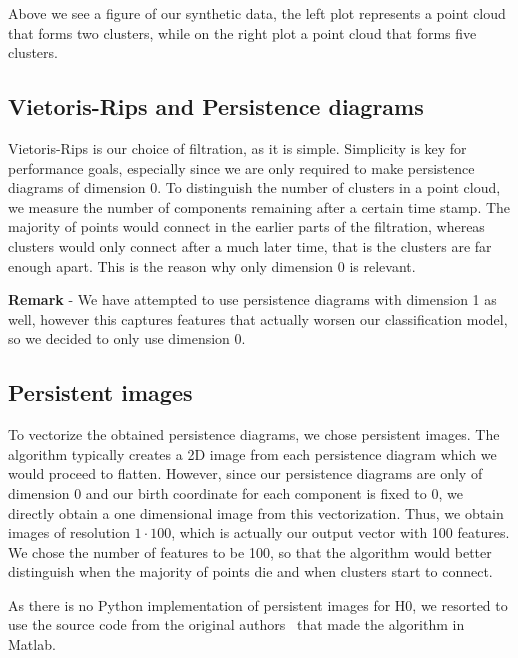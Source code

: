 \documentclass{article}
\begin{document}
Above we see a figure of our synthetic data, the left plot represents a point cloud that forms two clusters, while on the right plot a point cloud that forms five clusters.


\subsection{Vietoris-Rips and Persistence diagrams}
Vietoris-Rips is our choice of filtration, as it is simple. Simplicity is key for performance goals, especially since we are only required to make persistence diagrams of dimension 0. To distinguish the number of clusters in a point cloud, we measure the number of components remaining after a certain time stamp. The majority of points would connect in the earlier parts of the filtration, whereas clusters would only connect after a much later time, that is the clusters are far enough apart. This is the reason why only dimension 0 is relevant.

\textbf{Remark} - We have attempted to use persistence diagrams with dimension 1 as well, however this captures features that actually worsen our classification model, so we decided to only use dimension 0.


\subsection{Persistent images}
To vectorize the obtained persistence diagrams, we chose persistent images. The algorithm typically creates a 2D image from each persistence diagram which we would proceed to flatten. However, since our persistence diagrams are only of dimension 0 and our birth coordinate for each component is fixed to 0, we directly obtain a one dimensional image from this vectorization. Thus, we obtain images of resolution $1 \cdot 100$, which is actually our output vector with 100 features. We chose the number of features to be 100, so that the algorithm would better distinguish when the majority of points die and when clusters start to connect.

As there is no Python implementation of persistent images for H0, we resorted to use the source code from the original authors~\cite{PIarticle} that made the algorithm in Matlab.
\end{document}
